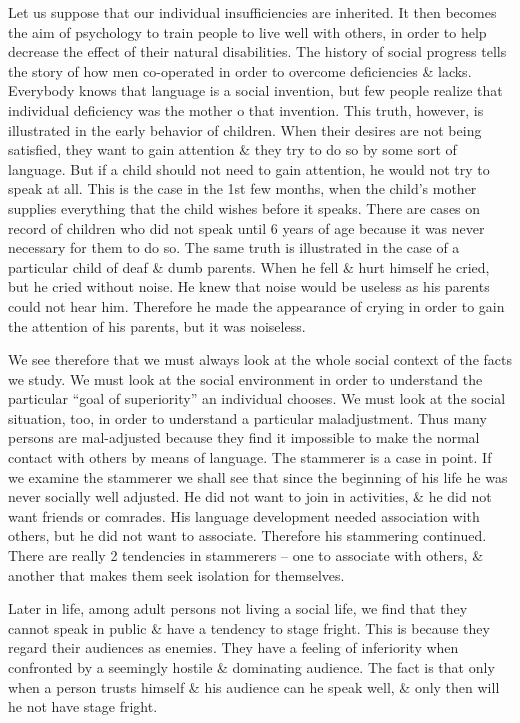 \documentclass{article}
\numberwithin{equation}{section}
\begin{document}
Let us suppose that our individual insufficiencies are inherited. It then becomes the aim of psychology to train people to live well with others, in order to help decrease the effect of their natural disabilities. The history of social progress tells the story of how men co-operated in order to overcome deficiencies \& lacks. Everybody knows that language is  a social invention, but few people realize that individual deficiency was the mother o that invention. This truth, however, is illustrated in the early behavior of children. When their desires are not being satisfied, they want to gain attention \& they try to do so by some sort of language. But if a child should not need to gain attention, he would not try to speak at all. This is the case in the 1st few months, when the child's mother supplies everything that the child wishes before it speaks. There are cases on record of children who did not speak until 6 years of age because it was never necessary for them to do so. The same truth is illustrated in the case of a particular child of deaf \& dumb parents. When he fell \& hurt himself he cried, but he cried without noise. He knew that noise would be useless as his parents could not hear him. Therefore he made the appearance of crying in order to gain the attention of his parents, but it was noiseless.

We see therefore that we must always look at the whole social context of the facts we study. We must look at the social environment in order to understand the particular ``goal of superiority'' an individual chooses. We must look at the social situation, too, in order to understand a particular maladjustment. Thus many persons are mal-adjusted because they find it impossible to make the normal contact with others by means of language. The stammerer is a case in point. If we examine the stammerer we shall see that since the beginning of his life he was never socially well adjusted. He did not want to join in activities, \& he did not want friends or comrades. His language development needed association with others, but he did not want to associate. Therefore his stammering continued. There are really 2 tendencies in stammerers -- one to associate with others, \& another that makes them seek isolation for themselves.

Later in life, among adult persons not living a social life, we find that they cannot speak in public \& have a tendency to stage fright. This is because they regard their audiences as enemies. They have a feeling of inferiority when confronted by a seemingly hostile \& dominating audience. The fact is that only when a person trusts himself \& his audience can he speak well, \& only then will he not have stage fright.
\end{document}

